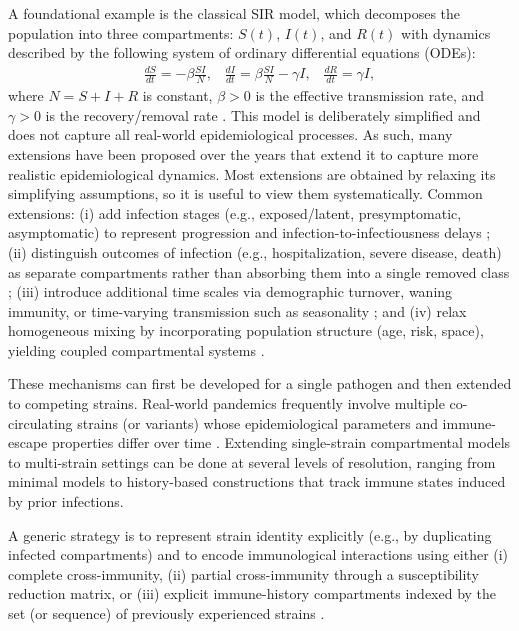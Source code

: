 \documentclass[11pt,a4paper]{article}
\begin{document}
A foundational example is the classical SIR model, which decomposes the population into three compartments: $S(t)$, $I(t)$, and $R(t)$ with dynamics described by the following system of ordinary differential equations (ODEs): 
\begin{equation}
\label{eq:sir}
\begin{aligned}
\frac{dS}{dt} = -\beta \frac{S I}{N}, \; \; \;
\frac{dI}{dt} = \beta \frac{S I}{N} - \gamma I,  \; \; \;
\frac{dR}{dt} = \gamma I,
\end{aligned}
\end{equation}
where $N=S+I+R$ is constant, $\beta>0$ is the effective transmission rate, and $\gamma>0$ is the recovery/removal rate \cite{first_sir}. This model is deliberately simplified and does not capture all real-world epidemiological processes. As such, many extensions have been proposed over the years that extend it to capture more realistic epidemiological dynamics. Most extensions are obtained by relaxing its simplifying assumptions, so it is useful to view them systematically. Common extensions: (i) add infection stages (e.g., exposed/latent, presymptomatic, asymptomatic) to represent progression and infection-to-infectiousness delays \cite{Hethcote2000}; (ii) distinguish outcomes of infection (e.g., hospitalization, severe disease, death) as separate compartments rather than absorbing them into a single removed class \cite{Hethcote2000}; (iii) introduce additional time scales via demographic turnover, waning immunity, or time-varying transmission such as seasonality \cite{Hethcote2000}; and (iv) relax homogeneous mixing by incorporating population structure (age, risk, space), yielding coupled compartmental systems \cite{shuchami2025spatio}.

These mechanisms can first be developed for a single pathogen and then extended to competing strains. Real-world pandemics frequently involve multiple co-circulating strains (or variants) whose epidemiological parameters and immune-escape properties differ over time \cite{shami2022economic}. Extending single-strain compartmental models to multi-strain settings can be done at several levels of resolution, ranging from minimal  models
to history-based constructions that track immune states induced by prior infections.

A generic strategy is to represent strain identity explicitly (e.g., by duplicating infected compartments) and to
encode immunological interactions using either (i) complete cross-immunity, (ii) partial cross-immunity through
a susceptibility reduction matrix, or (iii) explicit immune-history compartments indexed by the set (or sequence)
of previously experienced strains \cite{lazebnik2022generic}.
\end{document}
